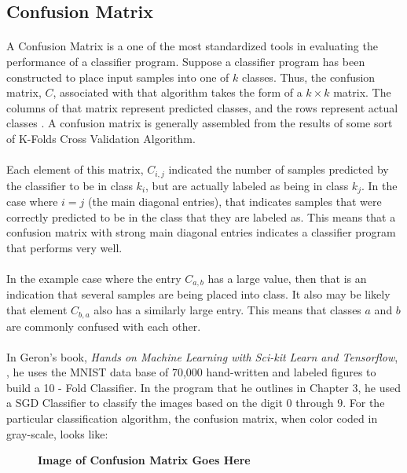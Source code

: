 \documentclass[12pt,letterpaper]{article}
\begin{document}

\subsection{Confusion Matrix}
\paragraph*{}A Confusion Matrix is a one of the most standardized tools in evaluating the performance of a classifier program. Suppose a classifier program has been constructed to place input samples into one of $k$ classes. Thus, the confusion matrix, $C$, associated with that algorithm takes the form of a $k \times k$ matrix. The columns of that matrix represent predicted classes, and the rows represent actual classes \cite{Geron}. A confusion matrix is generally assembled from the results of some sort of K-Folds Cross Validation Algorithm. 
\paragraph*{}Each element of this matrix, $C_{i,j}$ indicated the number of samples predicted by the classifier to be in class $k_i$, but are actually labeled as being in class $k_j$. In the case where $i = j$ (the main diagonal entries), that indicates samples that were correctly predicted to be in the class that they are labeled as. This means that a confusion matrix with strong main diagonal entries indicates a classifier program that performs very well. 
\paragraph*{}In the example case where the entry $C_{a,b}$ has a large value, then that is an indication that several samples are being placed into class. It also may be likely that element $C_{b,a}$ also has a similarly large entry. This means that classes $a$ and $b$ are commonly confused with each other. 
\paragraph*{}In Geron's book, \textit{Hands on Machine Learning with Sci-kit Learn and Tensorflow}, \cite{Geron}, he uses the MNIST data base of 70,000 hand-written and labeled figures to build a 10 - Fold Classifier. In the program that he outlines in Chapter 3, he used a SGD Classifier to classify the images based on the digit $0$ through $9$. For the particular classification algorithm, the confusion matrix, when color coded in gray-scale, looks like:
\begin{figure}[H]
\begin{center}
\textbf{Image of Confusion Matrix Goes Here}
\end{center}
\end{figure}
\end{document}
